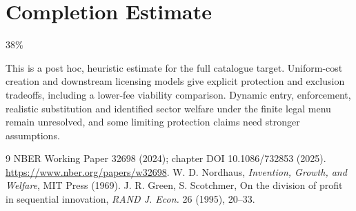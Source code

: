 \documentclass[11pt]{article}
\theoremstyle{definition}
\begin{document}
\section{Completion Estimate}
38\%

This is a post hoc, heuristic estimate for the full catalogue target.
Uniform-cost creation and downstream licensing models give explicit protection and exclusion tradeoffs, including a lower-fee viability comparison. Dynamic entry, enforcement, realistic substitution and identified sector welfare under the finite legal menu remain unresolved, and some limiting protection claims need stronger assumptions.

\begin{thebibliography}{9}
 NBER Working Paper 32698 (2024); chapter DOI 10.1086/732853 (2025). \url{https://www.nber.org/papers/w32698}.
 W. D. Nordhaus, \emph{Invention, Growth, and Welfare}, MIT Press (1969).
 J. R. Green, S. Scotchmer, On the division of profit in sequential innovation, \emph{RAND J. Econ.} 26 (1995), 20--33.
\end{thebibliography}
\end{document}
